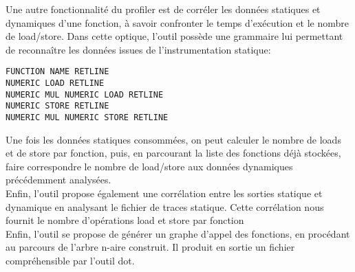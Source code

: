 \documentclass[oneside,11pt]{article}
\begin{document}
Une autre fonctionnalité du profiler est de corréler les données statiques et dynamiques d'une fonction, à savoir confronter le temps d'exécution et le nombre de load/store. Dans cette optique, l'outil possède une grammaire lui permettant de reconnaître les données issues de l'instrumentation statique:

\begin{verbatim}
FUNCTION NAME RETLINE
NUMERIC LOAD RETLINE
NUMERIC MUL NUMERIC LOAD RETLINE
NUMERIC STORE RETLINE
NUMERIC MUL NUMERIC STORE RETLINE
\end{verbatim}

Une fois les données statiques consommées, on peut calculer le nombre de loads et de store par fonction, puis, en parcourant la liste des fonctions déjà stockées, faire correspondre le nombre de load/store aux données dynamiques précédemment analysées.\\

Enfin, l'outil propose également une corrélation entre les sorties statique et dynamique en analysant le fichier de traces statique. Cette corrélation nous fournit le nombre d'opérations load et store par fonction\\

Enfin, l'outil se propose de générer un graphe d'appel des fonctions, en procédant au parcours de l'arbre n-aire construit. Il produit en sortie un fichier compréhensible par l'outil dot. 

\begin{center}
\end{center}
\end{document}
